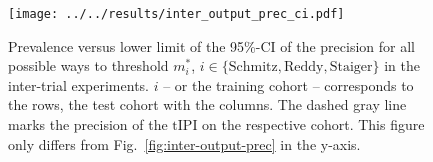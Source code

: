 \begin{figure}
    \centering
    \texttt{[image: ../../results/inter\_output\_prec\_ci.pdf]}
    \caption{Prevalence versus lower limit of the \num{95}\%-CI of the precision for all possible 
        ways to threshold $m^*_i$, $i \in \{ \text{Schmitz}, \text{Reddy}, \text{Staiger} \}$ in 
        the inter-trial experiments. $i$ -- or the training cohort -- corresponds to the rows, the 
        test cohort with the columns. The dashed gray 
        line marks the precision of the $\text{tIPI}$ on the respective cohort. This figure only 
        differs from Fig.\ \ref{fig:inter-output-prec} in the y-axis.}
    \label{fig:inter-output-prec-ci}
\end{figure}